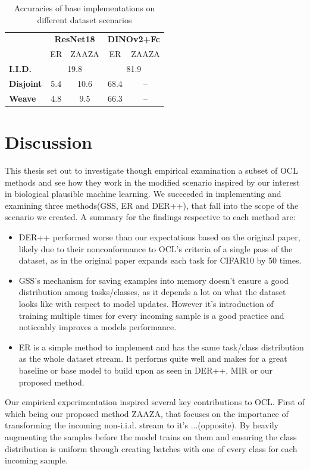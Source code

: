 \documentclass[oneside]{ctuthesis}
\begin{document}
\begin{table}[t]
    \centering
    \caption{Accuracies of base implementations on different dataset scenarios}
    \label{tab:pre-training-comparison}
    \begin{tabular}{lcccc}
        \toprule
        & \multicolumn{2}{c}{\textbf{ResNet18}} & \multicolumn{2}{c}{\textbf{DINOv2+Fc}} \\
        & ER & ZAAZA & ER & ZAAZA \\
        \midrule
        \textbf{I.I.D.}   & \multicolumn{2}{c}{19.8} & \multicolumn{2}{c}{81.9} \\
        \arrayrulecolor{gray!80}
        \midrule
        \arrayrulecolor{black} 
        \textbf{Disjoint} & 5.4 & 10.6 & 68.4 & -- \\
        \textbf{Weave}  & 4.8 & 9.5  & 66.3 & -- \\
        \bottomrule
    \end{tabular}
\end{table}












\chapter{Discussion}

This thesis set out to investigate though empirical examination a subset of OCL methods and see how they work in the modified scenario inspired by our interest in biological plausible machine learning. We succeeded in implementing and examining three methods(GSS, ER and DER++), that fall into the scope of the scenario we created. 
A summary for the findings respective to each method are:
\begin{itemize}
    \item DER++ performed worse than our expectations based on the original paper, likely due to their nonconformance to OCL's criteria of a single pass of the dataset, as in the original paper expands each task for CIFAR10 by 50 times.
    \item GSS's mechanism for saving examples into memory doesn't ensure a good distribution among tasks/classes, as it depends a lot on what the dataset looks like with respect to model updates. However it's introduction of training multiple times for every incoming sample is a good practice and noticeably improves a models performance. 
    \item ER is a simple method to implement and has the same task/class distribution as the whole dataset stream. It performs quite well and makes for a great baseline or base model to build upon as seen in DER++, MIR or our proposed method. 
\end{itemize}
Our empirical experimentation inspired several key contributions to OCL. First of which being our proposed method ZAAZA, that focuses on the importance of transforming the incoming non-i.i.d. stream to it's ...(opposite). By heavily augmenting the samples before the model trains on them and ensuring the class distribution is uniform through creating batches with one of every class for each incoming sample.
\end{document}
